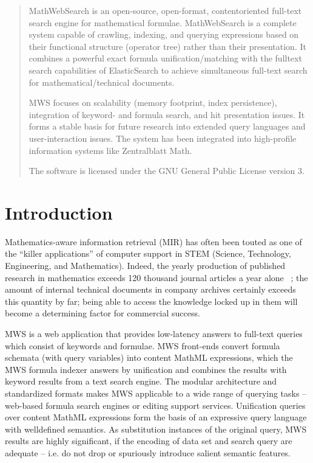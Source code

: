\documentclass{deliverablereport}
\author{Michael Kohlhase \& Alexandru Glontaru}
\begin{document}
\maketitle
\begin{abstract}
MathWebSearch is an open-source, open-format, contentoriented full-text search engine for mathematical formulae. MathWebSearch is a complete system capable of crawling, indexing, and querying expressions based on their functional structure (operator tree) rather than their presentation. It combines a powerful exact formula unification/matching with the fulltext search capabilities of ElasticSearch to achieve simultaneous full-text search for mathematical/technical documents. \par
MWS focuses on scalability (memory footprint, index persistence), integration of keyword- and formula search, and hit presentation issues. It forms a stable basis for future research into extended query languages and user-interaction issues. The system has been integrated into high-profile information systems like Zentralblatt Math. 
 
The software is licensed under the GNU General Public License version 3. 
 
 
\end{abstract}
\newpage\tableofcontents\listoffigures\newpage

\section{Introduction}\label{sec:intro}
Mathematics-aware information retrieval (MIR) has often been touted as one of the “killer
applications” of computer support in STEM (Science, Technology, Engineering, and
Mathematics). Indeed, the yearly production of published research in mathematics exceeds
120 thousand journal articles a year alone ~\cite{KohProHam:ntcir11}; the amount of internal technical documents in
company archives certainly exceeds this quantity by far; being able to access the
knowledge locked up in them will become a determining factor for commercial success.

MWS is a web application that provides low-latency answers to full-text queries which
consist of keywords and formulae. MWS front-ends convert formula schemata (with query
variables) into content MathML expressions, which the MWS formula indexer answers by
unification and combines the results with keyword results from a text search engine. The
modular architecture and standardized formats makes MWS applicable to a wide range of
querying tasks – web-based formula search engines or editing support services. Unification
queries over content MathML expressions form the basis of an expressive query language
with welldefined semantics. As substitution instances of the original query, MWS results
are highly significant, if the encoding of data set and search query are adequate –
i.e. do not drop or spuriously introduce salient semantic features. ~\cite{KohProHam:ntcir11}
\end{document}
